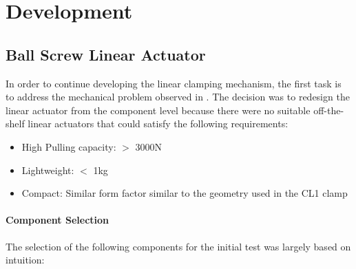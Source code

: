 \section{Development}
\label{section:exploration-2-development}

\subsection{Ball Screw Linear Actuator}
\label{subsection:exploration-2-ball-screw-linear-actuator}

In order to continue developing the linear clamping mechanism, the first task is to address the mechanical problem observed in . The decision was to redesign the linear actuator from the component level because there were no suitable off-the-shelf linear actuators that could satisfy the following requirements:

\begin{itemize}[nosep]
    \item High Pulling capacity: $>$ 3000N
    \item Lightweight: $<$ 1kg
    \item Compact: Similar form factor similar to the geometry used in the CL1 clamp 
\end{itemize}

\paragraph{Component Selection}

The selection of the following components for the initial test was largely based on intuition:

